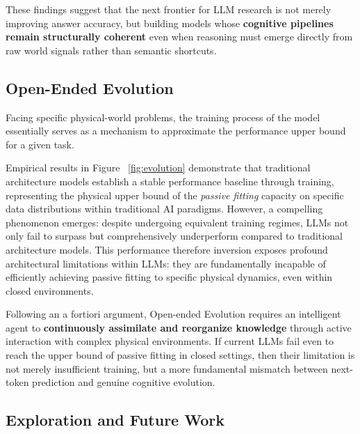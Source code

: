 These findings suggest that the next frontier for LLM research is not merely improving answer accuracy, but building models whose \textbf{cognitive pipelines remain structurally coherent} even when reasoning must emerge directly from raw world signals rather than semantic shortcuts.


\subsection{Open-Ended Evolution}
\label{evolution}
Facing specific physical-world problems, the training process of the model essentially serves as a mechanism to approximate the performance upper bound for a given task.

Empirical results in Figure ~\ref{fig:evolution} demonstrate that traditional architecture models establish a stable performance baseline through training, representing the physical upper bound of the \emph{passive fitting} capacity on specific data distributions within traditional AI paradigms. 
However, a compelling phenomenon emerges: 
despite undergoing equivalent training regimes, LLMs not only fail to surpass but comprehensively underperform compared to traditional architecture models. 
This performance therefore inversion exposes profound architectural limitations within LLMs: 
they are fundamentally incapable of efficiently achieving passive fitting to specific physical dynamics, even within closed environments. 

Following an a fortiori argument, Open-ended Evolution requires an intelligent agent to \textbf{continuously assimilate and reorganize knowledge} through active interaction with complex physical environments. 
If current LLMs fail even to reach the upper bound of passive fitting in closed settings, then their limitation is not merely insufficient training, but a more fundamental mismatch between next-token prediction and genuine cognitive evolution. 


\subsection{Exploration and Future Work}
\label{future}

